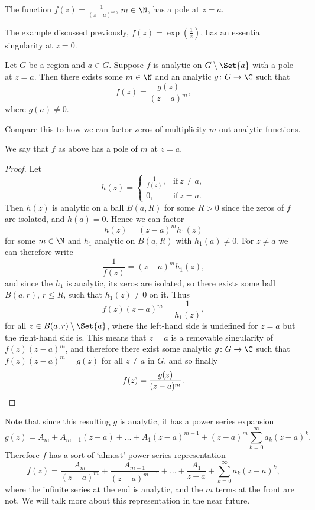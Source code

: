 \begin{example}
	The function $f(z) = \frac{1}{(z - a)^m}$, $m \in \N$, has a pole at $z = a$.
\end{example}

\begin{example}
	The example discussed previously, $f(z) = \exp(\frac{1}{z})$, has an essential singularity at $z = 0$.
\end{example}

\begin{proposition}\label{prop5.2}
	Let $G$ be a region and $a \in G$.
	Suppose $f$ is analytic on $G \setminus \Set{a}$ with a pole at $z = a$.
	Then there exists some $m \in \N$ and an analytic $g \colon G \to \C$ such that
	\[
		f(z) = \frac{g(z)}{(z - a)^m},
	\]
	where $g(a) \neq 0$.
\end{proposition}

Compare this to how we can factor zeros of multiplicity $m$ out analytic functions.

\begin{remark}
	We say that $f$ as above has a pole of  $m$ at $z = a$.
\end{remark}

\begin{proof}
	Let
	\[
		h(z) = \begin{cases}
			\frac{1}{f(z)}, & \text{if}~ z \neq a, \\
			0, & \text{if}~ z = a.
		\end{cases}
	\]
	Then $h(z)$ is analytic on a ball $B(a, R)$ for some $R > 0$ since the zeros of $f$ are isolated, and $h(a) = 0$.
	Hence we can factor
	\[
		h(z) = (z - a)^m h_1(z)
	\]
	for some $m \in \N$ and $h_1$ analytic on $B(a, R)$ with $h_1(a) \neq 0$.
	For $z \neq a$ we can therefore write
	\[
		\frac{1}{f(z)} = (z - a)^m h_1(z),
	\]
	and since the $h_1$ is analytic, its zeros are isolated, so there exists some ball $B(a, r)$, $r \leq R$, such that $h_1(z) \neq 0$ on it.
	Thus
	\[
		f(z) (z - a)^m = \frac{1}{h_1(z)},
	\]
	for all $z \in B(a, r) \setminus \Set{a}$, where the left-hand side is undefined for $z = a$ but the right-hand side is.
	This means that $z = a$ is a removable singularity of $f(z) (z -a )^m$, and therefore there exist some analytic $g \colon G \to \C$ such that $f(z) (z - a)^m = g(z)$ for all $z \neq a$ in $G$, and so finally
	\[
		f(z) = \frac{g(z)}{(z - a)^m}. \qedhere
	\]
\end{proof}

Note that since this resulting $g$ is analytic, it has a power series expansion
\[
	g(z) = A_m + A_{m - 1} (z - a) + \dots + A_1 (z - a)^{m - 1} + (z - a)^m \sum_{k = 0}^\infty a_k (z - a)^k.
\]
Therefore $f$ has a sort of `almost' power series representation
\[
	f(z) = \frac{A_m}{(z - a)^m} + \frac{A_{m - 1}}{(z - a)^{m - 1}} + \dots + \frac{A_1}{z - a} + \sum_{k = 0}^\infty a_k (z - a)^k,
\]
where the infinite series at the end is analytic, and the $m$ terms at the front are not.
We will talk more about this representation in the near future.
